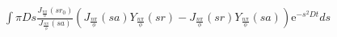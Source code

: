\documentclass{article}
\begin{document}
\begin{eqnarray}
\int\pi Ds\frac{J_{\frac{n\pi}{\phi}}(sr_0)}{J_{\frac{n\pi}{\phi}}(sa)}
    \left(J_{\frac{n\pi}{\phi}}(sa)Y_{\frac{n\pi}{\phi}}(sr) -
          J_{\frac{n\pi}{\phi}}(sr)Y_{\frac{n\pi}{\phi}}(sa)\right)
    \mathrm{e}^{-s^2Dt}ds
\end{eqnarray}
\end{document}
